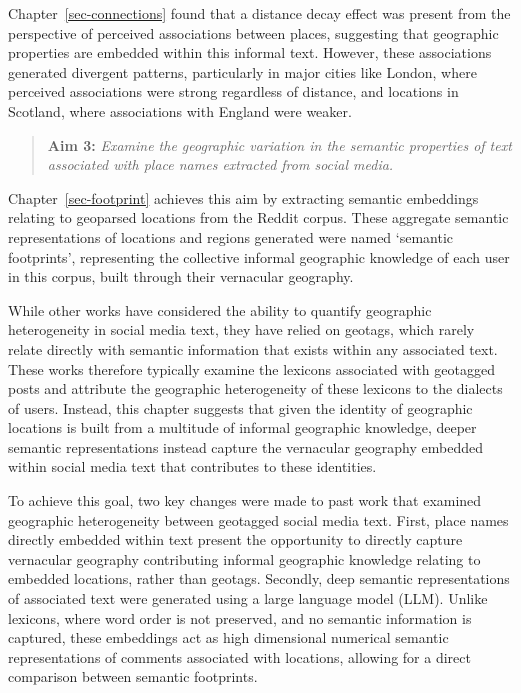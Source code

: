 \documentclass[
  letterpaper,
  11pt,
  english,
  onehalfspacing,
  headsepline]{MastersDoctoralThesis}
\begin{document}
Chapter~\ref{sec-connections} found that a distance decay effect was
present from the perspective of perceived associations between places,
suggesting that geographic properties are embedded within this informal
text. However, these associations generated divergent patterns,
particularly in major cities like London, where perceived associations
were strong regardless of distance, and locations in Scotland, where
associations with England were weaker.

\begin{quote}
\textbf{Aim 3:} \emph{Examine the geographic variation in the semantic
properties of text associated with place names extracted from social
media.}
\end{quote}

Chapter~\ref{sec-footprint} achieves this aim by extracting semantic
embeddings relating to geoparsed locations from the Reddit corpus. These
aggregate semantic representations of locations and regions generated
were named `semantic footprints', representing the collective informal
geographic knowledge of each user in this corpus, built through their
vernacular geography.

While other works have considered the ability to quantify geographic
heterogeneity in social media text, they have relied on geotags, which
rarely relate directly with semantic information that exists within any
associated text. These works therefore typically examine the lexicons
associated with geotagged posts and attribute the geographic
heterogeneity of these lexicons to the dialects of users. Instead, this
chapter suggests that given the identity of geographic locations is
built from a multitude of informal geographic knowledge, deeper semantic
representations instead capture the vernacular geography embedded within
social media text that contributes to these identities.

To achieve this goal, two key changes were made to past work that
examined geographic heterogeneity between geotagged social media text.
First, place names directly embedded within text present the opportunity
to directly capture vernacular geography contributing informal
geographic knowledge relating to embedded locations, rather than
geotags. Secondly, deep semantic representations of associated text were
generated using a large language model (LLM). Unlike lexicons, where
word order is not preserved, and no semantic information is captured,
these embeddings act as high dimensional numerical semantic
representations of comments associated with locations, allowing for a
direct comparison between semantic footprints.
\end{document}
